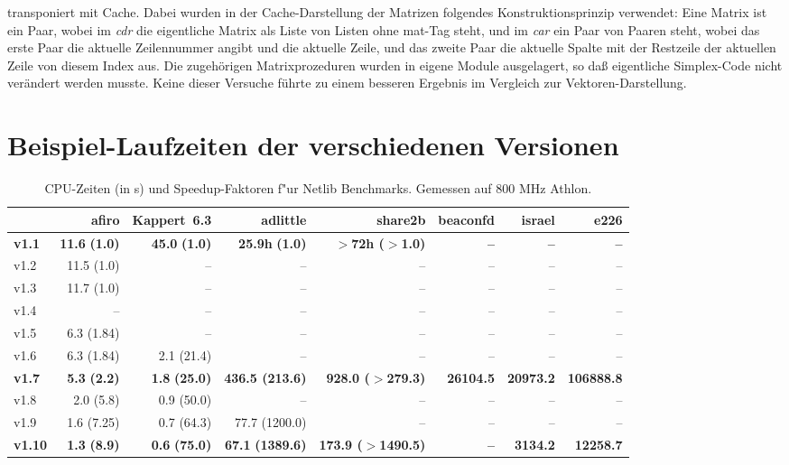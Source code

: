 \documentclass[a4paper]{article}
\begin{document}
\begin{description}
	transponiert mit Cache. Dabei wurden in der Cache-Darstellung der 
	Matrizen folgendes Konstruktionsprinzip verwendet: Eine Matrix ist ein
	Paar, wobei im \textit{cdr} die eigentliche Matrix als Liste von Listen 	ohne mat-Tag steht, und im \textit{car} ein Paar von Paaren steht, 
	wobei das erste Paar die aktuelle Zeilennummer angibt und die aktuelle 		Zeile, und das zweite Paar die aktuelle Spalte mit der Restzeile der 
	aktuellen Zeile von diesem Index aus.
	Die zugehörigen Matrixprozeduren wurden in eigene Module ausgelagert,
	so daß eigentliche Simplex-Code nicht verändert werden musste.
	Keine dieser Versuche führte zu einem besseren Ergebnis im Vergleich 
	zur Vektoren-Darstellung.
\end{description}

\newpage

\section{Beispiel-Laufzeiten der verschiedenen Versionen}

\begin{table}[h]
\caption{CPU-Zeiten (in s) und Speedup-Faktoren f"ur Netlib
Benchmarks. Gemessen auf 800 MHz Athlon.}
\begin{small}
\begin{tabular}{lrrrrrrr}
\hline
 & afiro & Kappert~6.3 & adlittle & share2b & beaconfd & israel & e226\\
\hline
\textbf{v1.1} & \textbf{11.6} \textbf{(1.0)} & \textbf{45.0}
\textbf{(1.0)} &  \textbf{25.9h} \textbf{(1.0)} &\textbf{$>$72h ($>$1.0)}
& \textbf{--} & \textbf{--} & \textbf{--} \\
v1.2 & 11.5 (1.0) & -- & -- & -- & -- & -- & -- \\
v1.3 & 11.7 (1.0) & -- & --  & -- & -- & -- & -- \\
v1.4 & -- & -- & -- & -- & -- & -- & -- 	\\
v1.5 & 6.3 (1.84) & -- & -- & -- & -- & -- & -- \\
v1.6 & 6.3 (1.84) & 2.1 (21.4) & -- & -- & -- & -- & --  \\
\textbf{v1.7} & \textbf{5.3} \textbf{(2.2)} & \textbf{1.8}
\textbf{(25.0)} & \textbf{436.5 (213.6)} & \textbf{928.0 ($>$279.3)} & \textbf{26104.5} &
\textbf{20973.2} & \textbf{106888.8}  \\
v1.8 & 2.0 (5.8) & 0.9 (50.0) & -- & -- & -- & -- & --  \\
v1.9 & 1.6 (7.25) & 0.7 (64.3) & 77.7 (1200.0) & -- & -- & -- & --  \\
\textbf{v1.10} & \textbf{1.3} \textbf{(8.9)} & \textbf{0.6}
\textbf{(75.0)} & \textbf{67.1} \textbf{(1389.6)} & \textbf{173.9 ($>$1490.5)} &
\textbf{--} & \textbf{3134.2} & \textbf{12258.7} \\
\hline
\end{tabular}
\end{small}
\end{table}
\end{document}
